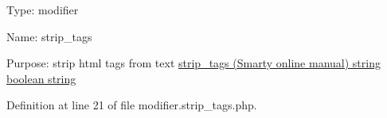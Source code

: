 \-Type\-: modifier\par
 \-Name\-: strip\-\_\-tags\par
 \-Purpose\-: strip html tags from text \hyperlink{}{strip\-\_\-tags (\-Smarty online manual)  string  boolean  string }

\-Definition at line 21 of file modifier.\-strip\-\_\-tags.\-php.


